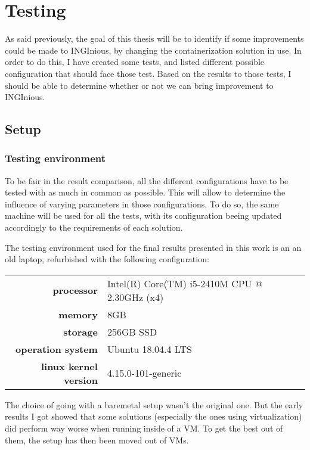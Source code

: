 \chapter{Testing}

As said previously, the goal of this thesis will be to identify if some improvements could be made to INGInious, by changing the containerization solution in use.  In order to do this, I have created some tests, and listed different possible configuration that should face those test.  Based on the results to those tests, I should be able to determine whether or not we can bring improvement to INGInious.

\section{Setup}
\subsection{Testing environment}
To be fair in the result comparison, all the different configurations have to be tested with as much in common as possible.  This will allow to determine the influence of varying parameters in those configurations.  To do so, the same machine will be used for all the tests, with its configuration beeing updated accordingly to the requirements of each solution.

The testing environment used for the final results presented in this work is an an old laptop, refurbished with the following configuration:\\
\begin{tabular}{rl}

  \textbf{processor} & Intel(R) Core(TM) i5-2410M CPU @ 2.30GHz (x4) \\
  \textbf{memory} & 8GB \\
  \textbf{storage} & 256GB SSD \\
  \textbf{operation system} & Ubuntu 18.04.4 LTS \\
  \textbf{linux kernel version} & 4.15.0-101-generic \\

\end{tabular}


The choice of going with a baremetal setup wasn't the original one.  But the early results I got showed that some solutions (especially the ones using virtualization) did perform way worse when running inside of a VM.  To get the best out of them, the setup has then been moved out of VMs.

